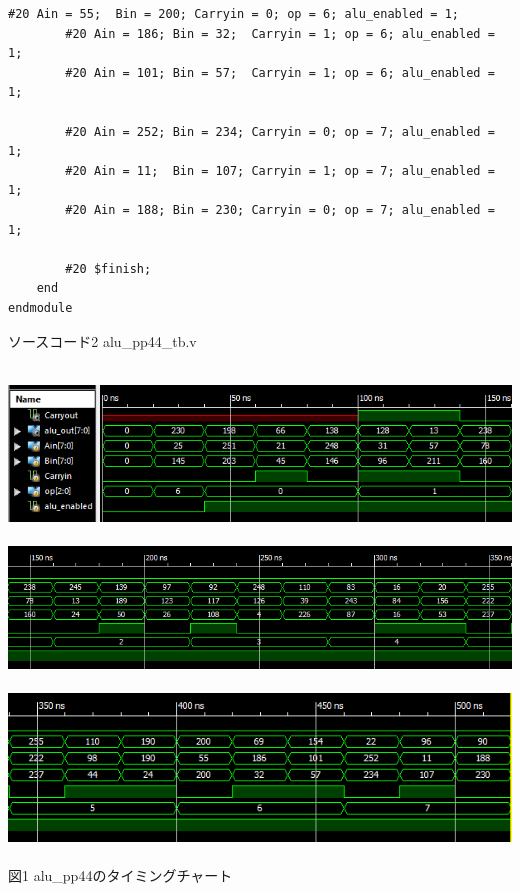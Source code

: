 \documentclass[12pt]{jreport}
\begin{document}
\begin{center}
\begin{lstlisting}[basicstyle=\ttfamily\footnotesize, frame=single]
        #20 Ain = 55;  Bin = 200; Carryin = 0; op = 6; alu_enabled = 1;
        #20 Ain = 186; Bin = 32;  Carryin = 1; op = 6; alu_enabled = 1;
        #20 Ain = 101; Bin = 57;  Carryin = 1; op = 6; alu_enabled = 1;

        #20 Ain = 252; Bin = 234; Carryin = 0; op = 7; alu_enabled = 1;
        #20 Ain = 11;  Bin = 107; Carryin = 1; op = 7; alu_enabled = 1;
        #20 Ain = 188; Bin = 230; Carryin = 0; op = 7; alu_enabled = 1;

        #20 $finish;
    end
endmodule

            \end{lstlisting}
            ソースコード2 alu\_pp44\_tb.v \\　\\
        \end{center}

        \begin{center}
            \includegraphics[width=18cm]{apu_op44_1.png} \\　\\
            \includegraphics[width=18cm]{apu_op44_2.png} \\　\\
            \includegraphics[width=18cm]{apu_op44_3.png} \\　\\
                図1 alu\_pp44のタイミングチャート
        \end{center}
\end{document}
